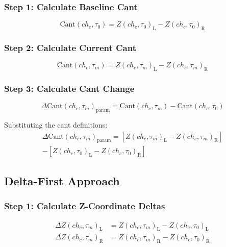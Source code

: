 \documentclass{article}
\newcommand{\chainage}[1]{ch_{#1}}
\newcommand{\Left}{\text{L}}
\newcommand{\Right}{\text{R}}
\newcommand{\Z}[3]{Z(#1, #2)_{#3}}
\newcommand{\DZ}[3]{\Delta Z(#1, #2)_{#3}}
\newcommand{\Cant}[2]{\text{Cant}(#1, #2)}
\newcommand{\DCant}[2]{\Delta\text{Cant}(#1, #2)}
\begin{document}
\subsubsection{Step 1: Calculate Baseline Cant}
\begin{equation}
\Cant{\chainage{c}}{\tau_0} = \Z{\chainage{c}}{\tau_0}{\Left} - \Z{\chainage{c}}{\tau_0}{\Right}
\end{equation}

\subsubsection{Step 2: Calculate Current Cant}
\begin{equation}
\Cant{\chainage{c}}{\tau_m} = \Z{\chainage{c}}{\tau_m}{\Left} - \Z{\chainage{c}}{\tau_m}{\Right}
\end{equation}

\subsubsection{Step 3: Calculate Cant Change}
\begin{equation}
\DCant{\chainage{c}}{\tau_m}_{\text{param}} = \Cant{\chainage{c}}{\tau_m} - \Cant{\chainage{c}}{\tau_0}
\end{equation}

Substituting the cant definitions:
\begin{multline}
\DCant{\chainage{c}}{\tau_m}_{\text{param}} = \left[\Z{\chainage{c}}{\tau_m}{\Left} - \Z{\chainage{c}}{\tau_m}{\Right}\right] \\
- \left[\Z{\chainage{c}}{\tau_0}{\Left} - \Z{\chainage{c}}{\tau_0}{\Right}\right]
\end{multline}

\subsection{Delta-First Approach}

\subsubsection{Step 1: Calculate Z-Coordinate Deltas}
\begin{align}
\DZ{\chainage{c}}{\tau_m}{\Left} &= \Z{\chainage{c}}{\tau_m}{\Left} - \Z{\chainage{c}}{\tau_0}{\Left} \\
\DZ{\chainage{c}}{\tau_m}{\Right} &= \Z{\chainage{c}}{\tau_m}{\Right} - \Z{\chainage{c}}{\tau_0}{\Right}
\end{align}
\end{document}
